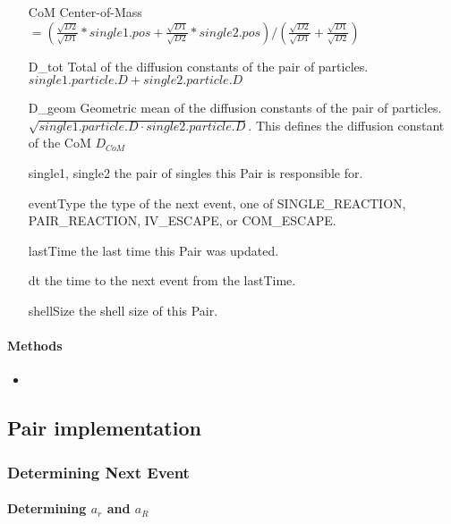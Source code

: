 \documentclass[english]{article}
\begin{document}
\begin{itemize}
\item[CoM] Center-of-Mass  
  $= ( \frac{\sqrt{D2}}{\sqrt{D1}} * single1.pos +
  \frac{\sqrt{D1}}{\sqrt{D2}} * single2.pos ) / (
  \frac{\sqrt{D2}}{\sqrt{D1}}+\frac{\sqrt{D1}}{\sqrt{D2}})$

\item[D_tot] Total of the diffusion constants of the pair of particles.
 $single1.particle.D + single2.particle.D$

\item[D_geom] Geometric mean of the diffusion constants of the pair of
  particles.  $\sqrt{ single1.particle.D \cdot single2.particle.D}$.
  This defines the diffusion constant of the CoM $D_{CoM}$


\item[single1, single2] the pair of singles this Pair is responsible for.

\item[eventType] the type of the next event, one of SINGLE_REACTION,
  PAIR_REACTION, IV_ESCAPE, or COM_ESCAPE.

\item[lastTime] the last time this Pair was updated.

\item[dt] the time to the next event from the lastTime.

\item[shellSize] the shell size of this Pair.

\end{itemize}

\paragraph{Methods}

\begin{itemize}
\item 
\end{itemize}


\subsection{Pair implementation}

\subsubsection{Determining Next Event}

\paragraph{Determining $a_r$ and $a_R$}
\end{document}
